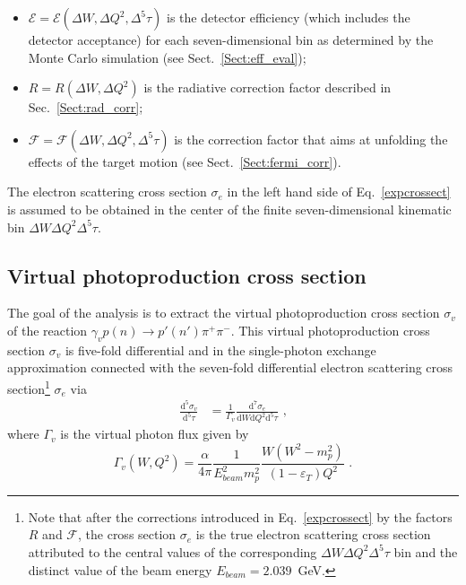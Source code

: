 \begin{itemize}
\item $\mathcal{E} = \mathcal{E}(\Delta W, \Delta Q^{2}, \Delta^{5}\tau)$ is the detector efficiency (which includes the detector acceptance) for each seven-dimensional bin as determined by the Monte Carlo simulation (see Sect.~\ref{Sect:eff_eval}); \vspace{-0.25em}

\item $R = R(\Delta W, \Delta Q^{2})$ is the radiative correction factor described in Sec.~\ref{Sect:rad_corr}; \vspace{-0.25em}

\item $\mathcal{F} = \mathcal{F}(\Delta W, \Delta Q^{2}, \Delta^{5}\tau)$ is the correction factor that aims at unfolding the effects of the target motion (see Sect.~\ref{Sect:fermi_corr}).

\end{itemize}

The electron scattering cross section $\sigma_{e}$ in the left hand side of Eq.~\eqref{expcrossect} is assumed to be obtained in the center of the finite seven-dimensional kinematic bin $\Delta W \Delta Q^{2} \Delta^{5} \tau$. 





\subsection{Virtual photoproduction cross section}

The goal of the analysis is to extract the virtual photoproduction cross section $\sigma_{v}$ of the reaction $\gamma_{v}p(n) \rightarrow p'(n') \pi^{+} \pi^{-}$. This virtual photoproduction cross section $\sigma_{v}$ is five-fold differential and in the single-photon exchange approximation connected with the seven-fold differential electron scattering cross section\footnote[12]{Note that after the corrections introduced in Eq.~\eqref{expcrossect} by the factors $R$ and $\mathcal{F}$, the cross section $\sigma_{e}$ is the true electron scattering cross section attributed to the central values of the corresponding $\Delta W \Delta Q^{2} \Delta^{5} \tau$ bin and the distinct value of the beam energy $E_{beam} = 2.039$~GeV.} $\sigma_{e}$ via 
\begin{equation}
\begin{aligned}
\frac{\textrm{d}^{5}\sigma_{v}}{\textrm{d}^{5}\tau} &= \frac{1}{\Gamma_{v}}\frac{\textrm{d}^{7}\sigma_{e}}{\textrm{d}W\textrm{d}Q^{2}\textrm{d}^{5}\tau}  \textrm{ ,}
\end{aligned} 
\label{fulldiff}
\end{equation}
where $\Gamma_{v}$ is the virtual photon flux given by
\begin{equation}
\Gamma_{v} (W, Q^2) =
\frac{\alpha}{4\pi}\frac{1}{E_{beam}^{2}m_{p}^{2}}\frac{W(W^{2}-m_{p}^{2})}
{(1-\varepsilon_{T})Q^{2}} \textrm{ .}
\label{flux}
\end{equation}

